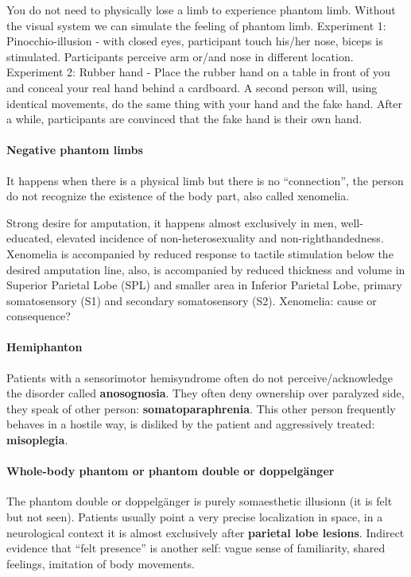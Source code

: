 \documentclass[12pt,article,oneside,a4paper]{memoir}
\begin{document}
You do not need to physically lose a limb to experience phantom limb. Without
the visual system we can simulate the feeling of phantom limb.
Experiment 1: Pinocchio-illusion - with closed eyes, participant touch his/her
nose, biceps is stimulated. Participants perceive arm or/and nose in different
location.
Experiment 2: Rubber hand - Place the rubber hand on a table in front of you
and conceal your real hand behind a cardboard. A second person will, using
identical movements, do the same thing with your hand and the fake hand. After 
a while, participants are convinced that the fake hand is their own hand.

\paragraph{Negative phantom limbs}
It happens when there is a physical limb but there is no ``connection'', the
person do not recognize the existence of the body part, also called xenomelia.

Strong desire for amputation, it happens almost exclusively in men, well-educated,
elevated incidence of non-heterosexuality and non-righthandedness. Xenomelia is
accompanied by reduced response to tactile stimulation below the desired
amputation line, also, is accompanied by reduced thickness and volume in Superior
Parietal Lobe (SPL) and smaller area in Inferior Parietal Lobe, primary
somatosensory (S1) and secondary somatosensory (S2).
Xenomelia: cause or consequence?

\paragraph{Hemiphanton}
Patients with a sensorimotor hemisyndrome often do not perceive/acknowledge
the disorder called \textbf{anosognosia}. They often deny ownership over
paralyzed side, they speak of other person: \textbf{somatoparaphrenia}. This
other person frequently behaves in a hostile way, is disliked by the patient and
aggressively treated: \textbf{misoplegia}.

\paragraph{Whole-body phantom or phantom double or doppelg\"anger}
The phantom double or doppelg\"anger is purely somaesthetic illusionn (it is
felt but not seen). Patients usually point a very precise localization in space,
in a neurological context it is almost exclusively after \textbf{parietal lobe
lesions}. Indirect evidence that ``felt presence'' is another self: vague sense
of familiarity, shared feelings, imitation of body movements.
\end{document}
